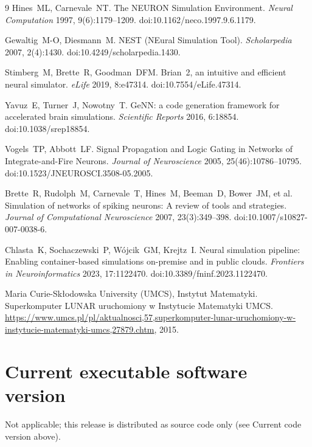 \documentclass[preprint,12pt, a4paper]{elsarticle}
\begin{document}
\begin{thebibliography}{9}
Hines~ML, Carnevale~NT.
The NEURON Simulation Environment.
\textit{Neural Computation} 1997, 9(6):1179--1209. doi:10.1162/neco.1997.9.6.1179.

Gewaltig~M-O, Diesmann~M.
NEST (NEural Simulation Tool).
\textit{Scholarpedia} 2007, 2(4):1430. doi:10.4249/scholarpedia.1430.

Stimberg~M, Brette~R, Goodman~DFM.
Brian~2, an intuitive and efficient neural simulator.
\textit{eLife} 2019, 8:e47314. doi:10.7554/eLife.47314.

Yavuz~E, Turner~J, Nowotny~T.
GeNN: a code generation framework for accelerated brain simulations.
\textit{Scientific Reports} 2016, 6:18854. doi:10.1038/srep18854.

Vogels~TP, Abbott~LF.
Signal Propagation and Logic Gating in Networks of Integrate-and-Fire Neurons.
\textit{Journal of Neuroscience} 2005, 25(46):10786--10795. doi:10.1523/JNEUROSCI.3508-05.2005.

Brette~R, Rudolph~M, Carnevale~T, Hines~M, Beeman~D, Bower~JM, et al.
Simulation of networks of spiking neurons: A review of tools and strategies.
\textit{Journal of Computational Neuroscience} 2007, 23(3):349--398. doi:10.1007/s10827-007-0038-6.

Chlasta~K, Sochaczewski~P, W\'ojcik~GM, Krejtz~I.
Neural simulation pipeline: Enabling container-based simulations on-premise and in public clouds.
\textit{Frontiers in Neuroinformatics} 2023, 17:1122470. doi:10.3389/fninf.2023.1122470.

Maria Curie-Sk{\l}odowska University (UMCS), Instytut Matematyki.
Superkomputer LUNAR uruchomiony w Instytucie Matematyki UMCS.
\url{https://www.umcs.pl/pl/aktualnosci,57,superkomputer-lunar-uruchomiony-w-instytucie-matematyki-umcs,27879.chtm}, 2015.

\end{thebibliography}


\section*{Current executable software version}
\label{}

Not applicable; this release is distributed as source code only (see Current code version above).
\end{document}
